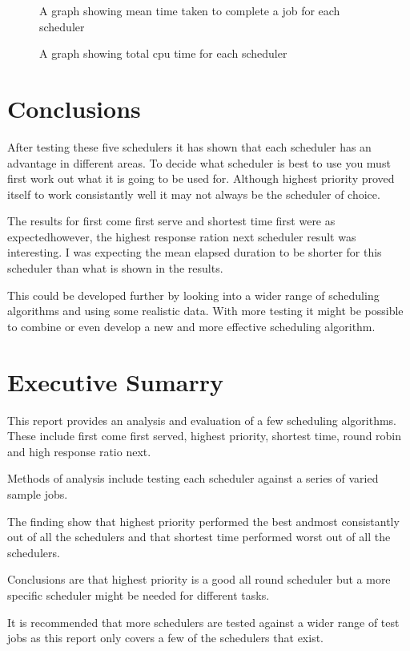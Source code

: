 \documentclass{acm_proc_article-sp}
\begin{document}
\begin{figure}
\centering
{}
\caption{A graph showing mean time taken to complete a job for each scheduler}
\end{figure}

\begin{figure}
\centering
{}
\caption{A graph showing total cpu time for each scheduler}
\end{figure}

\section{Conclusions}
After testing these five schedulers it has shown that each scheduler has an advantage in different areas. To decide what scheduler is best to use you must first work out what it is going to be used for. Although highest priority proved itself to work consistantly well it may not always be the scheduler of choice.

The results for first come first serve and shortest time first were as expectedhowever, the highest response ration next scheduler result was interesting. I was expecting the mean elapsed duration to be shorter for this scheduler than what is shown in the results.

This could be developed further by looking into a wider range of scheduling algorithms and using some realistic data. With more testing it might be possible to combine or even develop a new and more effective scheduling algorithm.


\section{Executive Sumarry}
This report provides an analysis and evaluation of a few scheduling algorithms. These include first come first served, highest priority, shortest time, round robin and high response ratio next.

Methods of analysis include testing each scheduler against a series of varied sample jobs.

The finding show that highest priority performed the best andmost consistantly out of all the schedulers and that shortest time performed worst out of all the schedulers.

Conclusions are that highest priority is a good all round scheduler but a more specific scheduler might be needed for different tasks.

It is recommended that more schedulers are tested against a wider range of test jobs as this report only covers a few of the schedulers that exist.


\end{document}
